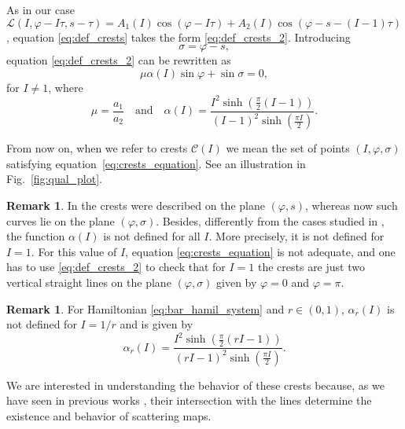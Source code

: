 \documentclass[a4paper,10pt]{article}
\newcommand{\NH}{\text{NHIM}}
\theoremstyle{definition}
\newtheorem{remark}[theorem]{Remark}
\begin{document}
As in our case $\mathcal{L}(I , \varphi - I\tau , s - \tau ) = A_1(I)\cos(\varphi - I\tau) + A_2( I ) \cos( \varphi  - s - (I - 1) \tau )$, equation \eqref{eq:def_crests} takes the form
\eqref{eq:def_crests_2}.
Introducing
\begin{equation}
\sigma = \varphi - s, \label{eq:def_sigma}
\end{equation}
equation \eqref{eq:def_crests_2} can be rewritten as
\begin{equation}
 \mu \alpha( I ) \sin\varphi + \sin\sigma =0,\label{eq:crests_equation}
\end{equation}
for $I \neq 1$, where
\begin{equation}
\mu = \frac{a_{1}}{a_{2}}\quad\text{and}\quad \alpha(I) =\frac{I^2\sinh(\frac{\pi}{2}(I-1))}{(I-1)^2\sinh(\frac{\pi I}{2})}.\label{eq:mu_alpha}
\end{equation}

From now on, when we refer to crests $\mathcal{C}(I)$ we mean the set of points $(I,\varphi , \sigma)$ satisfying equation~\eqref{eq:crests_equation}.
See an illustration in Fig.~\ref{fig:qual_plot}.

\begin{remark}
In \cite{Delshams2017} the crests were described on the plane $(\varphi , s )$, whereas now such curves lie on the plane $(\varphi , \sigma)$.
Besides, differently from the cases studied in \cite{Delshams2011,Delshams2017}, the function $\alpha(I)$ is not defined for all $I$.
More precisely, it is not defined for $I = 1$. For this value of $I$, equation \eqref{eq:crests_equation} is not adequate,
and one has to use \eqref{eq:def_crests_2} to check that for $I = 1$ the crests are just two vertical straight lines on the plane $(\varphi,\sigma)$ given by $\varphi = 0$ and $\varphi = \pi$.
\end{remark}
\begin{remark}
For Hamiltonian \eqref{eq:bar_hamil_system} and $r\in (0,1)$, $\alpha_{r}(I)$ is not defined for $I = 1/r$ and is given by
\begin{equation*}
\alpha_r(I) = \frac{I^2\sinh\left(\frac{\pi}{2}(rI - 1)\right)}{(rI-1)^2\sinh\left(\frac{\pi I}{2}\right)}.
\end{equation*}
\label{rem:r_2}
\end{remark}
We are interested in understanding the behavior of these crests because, as we have seen in previous works \cite{Delshams2011,Delshams2017}, their intersection with the {\NH} lines determine the existence and behavior of scattering maps.
\end{document}
